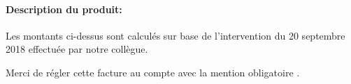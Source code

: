 \documentclass[a4paper,10pt]{article}
\begin{document}

\begin{xcalctab}
\normalfont




\end{xcalctab}



\vspace{\rsfbespaceVertical}


\paragraph*{Description du produit:}
Les montants ci-dessus sont calculés sur base de l’intervention du 20 septembre 2018 effectuée par notre collègue.


Merci de régler cette facture au compte \no \emph{\rsfbcompteBancaireCreancier{}} avec la mention obligatoire \emph{\rsfbmentionObligatoire{}}.


\rsfbCredit{}
\end{document}
